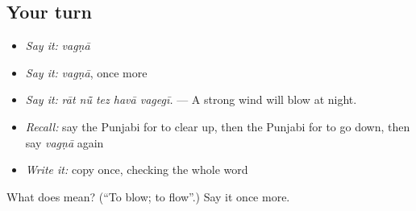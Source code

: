\subsection*{Your turn}
\begin{itemize}
\raggedright
  \item \emph{Say it:} \emph{vagṇā}
  \item \emph{Say it:} \emph{vagṇā}, once more
  \item \emph{Say it:} \emph{rāt nū̃ tez havā vagegī.} — A strong wind will blow at night.
  \item \emph{Recall:} say the Punjabi for to clear up, then the Punjabi for to go down, then say \emph{vagṇā} again
  \item \emph{Write it:} copy \textbf{} once, checking the whole word
\end{itemize}

\begin{tcolorbox}[breakable,colback=teal!4,colframe=teal!35!black,title={Before you move on}]
What does  mean? (\textquotedblleft{}To blow; to flow\textquotedblright{}.) Say it once more.
\end{tcolorbox}
